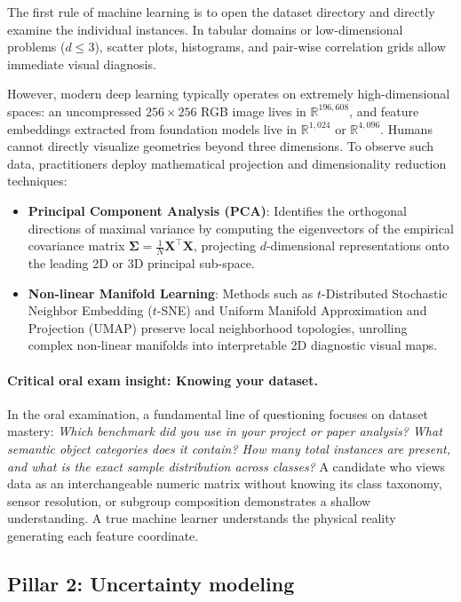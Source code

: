 The first rule of machine learning is to open the dataset directory and directly examine the individual instances. In tabular domains or low-dimensional problems ($d \le 3$), scatter plots, histograms, and pair-wise correlation grids allow immediate visual diagnosis.

However, modern deep learning typically operates on extremely high-dimensional spaces: an uncompressed $256 \times 256$ RGB image lives in $\mathbb{R}^{196,608}$, and feature embeddings extracted from foundation models live in $\mathbb{R}^{1,024}$ or $\mathbb{R}^{4,096}$. Humans cannot directly visualize geometries beyond three dimensions. To observe such data, practitioners deploy mathematical projection and dimensionality reduction techniques:
\begin{itemize}[noitemsep]
  \item \textbf{Principal Component Analysis (PCA)}: Identifies the orthogonal directions of maximal variance by computing the eigenvectors of the empirical covariance matrix $\mathbf{\Sigma} = \frac{1}{N}\mathbf{X}^\top \mathbf{X}$, projecting $d$-dimensional representations onto the leading 2D or 3D principal sub-space.
  \item \textbf{Non-linear Manifold Learning}: Methods such as $t$-Distributed Stochastic Neighbor Embedding ($t$-SNE) and Uniform Manifold Approximation and Projection (UMAP) preserve local neighborhood topologies, unrolling complex non-linear manifolds into interpretable 2D diagnostic visual maps.
\end{itemize}

\paragraph{Critical oral exam insight: Knowing your dataset.}
In the oral examination, a fundamental line of questioning focuses on dataset mastery: \emph{Which benchmark did you use in your project or paper analysis? What semantic object categories does it contain? How many total instances are present, and what is the exact sample distribution across classes?} A candidate who views data as an interchangeable numeric matrix without knowing its class taxonomy, sensor resolution, or subgroup composition demonstrates a shallow understanding. A true machine learner understands the physical reality generating each feature coordinate.

\subsection{Pillar 2: Uncertainty modeling}
\label{sec:pillar_2_uncertainty}

